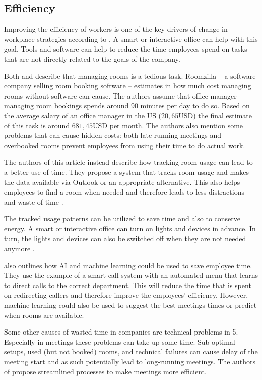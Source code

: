 \subsection{Efficiency}\label{sec:efficiency}
Improving the efficiency of workers is one of the key drivers of change in workplace strategies according to \cite{hub13}. A smart or interactive office can help with this goal. Tools and software can help to reduce the time employees spend on tasks that are not directly related to the goals of the company.

Both \cite{iotagenda} and \cite{roomzilla9} describe that managing rooms is a tedious task. Roomzilla -- a software company selling room booking software -- estimates in \cite{roomzilla9} how much cost managing rooms without software can cause. The authors assume that office manager managing room bookings spends around 90 minutes per day to do so. Based on the average salary of an office manager in the US (\(20,65\text{USD}\)) the final estimate of this task is around \(681,45\text{USD}\) per month. The authors also mention some problems that can cause hidden costs: both late running meetings and overbooked rooms prevent employees from using their time to do actual work. 

The authors of this article instead describe how tracking room usage can lead to a better use of time. They propose a system that tracks room usage and makes the data available via Outlook or an appropriate alternative. This also helps employees to find a room when needed and therefore leads to less distractions and waste of time \cite{iotagenda}.

The tracked usage patterns can be utilized to save time and also to conserve energy. A smart or interactive office can turn on lights and devices in advance. In turn, the lights and devices can also be switched off when they are not needed anymore \cite{hbcommunications}. 


\cite{hbcommunications} also outlines how AI and machine learning could be used to save employee time. They use the example of a smart call system with an automated menu that learns to direct calls to the correct department. This will reduce the time that is spent on redirecting callers and therefore improve the employees' efficiency. However, machine learning could also be used to suggest the best meetings times or predict when rooms are available.

Some other causes of wasted time in companies are technical problems in \cite{roomzilla3}5. Especially in meetings these problems can take up some time. Sub-optimal setups, used (but not booked) rooms, and technical failures can cause delay of the meeting start and as such potentially lead to long-running meetings. The authors of \cite{roomzilla3} propose streamlined processes to make meetings more efficient. 



